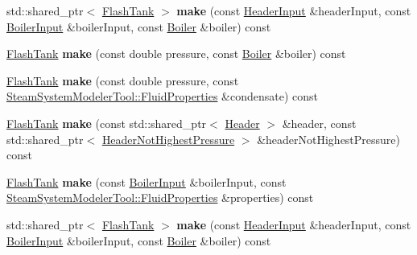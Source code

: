 \begin{DoxyCompactItemize}
\item 
\mbox{\label{class_flash_tank_factory_a70324810bceff23000701c1d69177db9}} 
std\+::shared\+\_\+ptr$<$ \hyperlink{class_flash_tank}{Flash\+Tank} $>$ {\bfseries make} (const \hyperlink{class_header_input}{Header\+Input} \&header\+Input, const \hyperlink{class_boiler_input}{Boiler\+Input} \&boiler\+Input, const \hyperlink{class_boiler}{Boiler} \&boiler) const
\item 
\mbox{\label{class_flash_tank_factory_a068b5e4eb6ad0390fb93817e0b9890f5}} 
\hyperlink{class_flash_tank}{Flash\+Tank} {\bfseries make} (const double pressure, const \hyperlink{class_boiler}{Boiler} \&boiler) const
\item 
\mbox{\label{class_flash_tank_factory_aceaed241ae5afb2b626c47d83c18f4e3}} 
\hyperlink{class_flash_tank}{Flash\+Tank} {\bfseries make} (const double pressure, const \hyperlink{struct_steam_system_modeler_tool_1_1_fluid_properties}{Steam\+System\+Modeler\+Tool\+::\+Fluid\+Properties} \&condensate) const
\item 
\mbox{\label{class_flash_tank_factory_a5daa9bc5b88ff891aa1b7db0723f5980}} 
\hyperlink{class_flash_tank}{Flash\+Tank} {\bfseries make} (const std\+::shared\+\_\+ptr$<$ \hyperlink{class_header}{Header} $>$ \&header, const std\+::shared\+\_\+ptr$<$ \hyperlink{class_header_not_highest_pressure}{Header\+Not\+Highest\+Pressure} $>$ \&header\+Not\+Highest\+Pressure) const
\item 
\mbox{\label{class_flash_tank_factory_a7b4ce87e0835a859903e182efe211af1}} 
\hyperlink{class_flash_tank}{Flash\+Tank} {\bfseries make} (const \hyperlink{class_boiler_input}{Boiler\+Input} \&boiler\+Input, const \hyperlink{struct_steam_system_modeler_tool_1_1_fluid_properties}{Steam\+System\+Modeler\+Tool\+::\+Fluid\+Properties} \&properties) const
\item 
\mbox{\label{class_flash_tank_factory_a70324810bceff23000701c1d69177db9}} 
std\+::shared\+\_\+ptr$<$ \hyperlink{class_flash_tank}{Flash\+Tank} $>$ {\bfseries make} (const \hyperlink{class_header_input}{Header\+Input} \&header\+Input, const \hyperlink{class_boiler_input}{Boiler\+Input} \&boiler\+Input, const \hyperlink{class_boiler}{Boiler} \&boiler) const

\end{DoxyCompactItemize}
